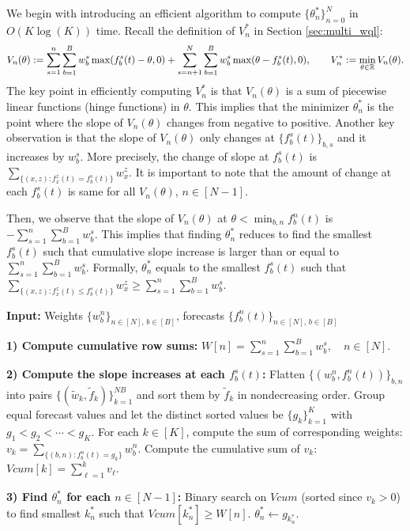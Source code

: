 We begin with introducing an efficient algorithm to compute $\{\theta_n^*\}_{n=0}^N$ in $O(K\log(K))$ time. Recall the definition of $V_n^*$ in Section \ref{sec:multi_wql}:
\[
V_n(\theta) := \sum_{s=1}^{n} \sum_{b=1}^B w_b^s \max(f_b^s(t)-\theta, 0) + \sum_{s=n+1}^{N}\sum_{b=1}^B  w_b^s \max(\theta - f_b^s(t), 0), 
\qquad V_n^* := \min_{\theta \in \mathbb{R}} V_n(\theta).
\]
The key point in efficiently computing $V_n^*$ is that $V_n(\theta)$ is a sum of piecewise linear functions (hinge functions) in $\theta$. This implies that the minimizer $\theta_n^*$ is the point where the slope of $V_n(\theta)$ changes from negative to positive. Another key observation is that the slope of $V_n(\theta)$ only changes at $\{f_b^s(t)\}_{b,s}$ and it increases by $w_b^s$. More precisely, the change of slope at $f_b^s(t)$ is $\sum_{\{(x,z): f_x^z(t) = f_b^s(t)\}} w_x^z$. It is important to note that the amount of change at each $f_b^s(t)$ is same for all $V_n(\theta)$, $n \in [N-1]$.

Then, we observe that the slope of $V_n(\theta)$ at $\theta < \min_{b,n} f_b^n(t)$ is $- \sum_{s=1}^{n} \sum_{b=1}^B w_b^s$. This implies that finding $\theta_n^*$ reduces to find the smallest $f_b^s(t)$ such that cumulative slope increase is larger than or equal to $\sum_{s=1}^{n} \sum_{b=1}^B w_b^s$. Formally, $\theta_n^*$ equals to the smallest $f_b^s(t)$ such that $\sum_{\{(x,z): f_x^z(t) \leq f_b^s(t)\}} w_x^z \geq \sum_{s=1}^{n} \sum_{b=1}^B w_b^s$.

\begin{algorithm}[h]
  \caption{Efficient computation of $\{\theta_n^*\}_{n=0}^N$}
  \label{alg:compute_theta_n_wql}
  \begin{algorithmic}[1]
  \State \textbf{Input:} Weights $\{w_b^n\}_{n \in [N],\, b \in [B]}$, forecasts $\{f_b^n(t)\}_{n \in [N],\, b \in [B]}$

  \State \textbf{1) Compute cumulative row sums:}
  \State $W[n] = \sum_{s=1}^{n} \sum_{b=1}^B w_b^s, \quad n \in [N]$.

  \State \textbf{2) Compute the slope increases at each $f_b^s(t)$:}
  \State Flatten $\{(w_b^n, f_b^n(t))\}_{b,n}$ into pairs $\{(\tilde{w}_k,\tilde{f}_k)\}_{k=1}^{NB}$ and sort them by $\tilde{f}_k$ in nondecreasing order.
  \State Group equal forecast values and let the distinct sorted values be $\{g_k\}_{k=1}^K$ with $g_1 < g_2 < \cdots < g_K$.
  \State For each $k \in [K]$, compute the sum of corresponding weights: $v_k = \sum_{\{(b,n): f_b^n(t) = g_k\}} w_b^n$.
  \State Compute the cumulative sum of $v_k$: $Vcum[k] = \sum_{\ell=1}^{k} v_\ell$.
  
  \State \textbf{3) Find $\theta_n^*$ for each $n \in [N-1]$:}
    \State Binary search on $Vcum$ (sorted since $v_k > 0$) to find smallest $k_n^*$ such that $Vcum[k_n^*] \geq W[n]$.
    \State $\theta_n^* \gets g_{k_n^*}$.
  \EndFor
  \end{algorithmic}
\end{algorithm}

